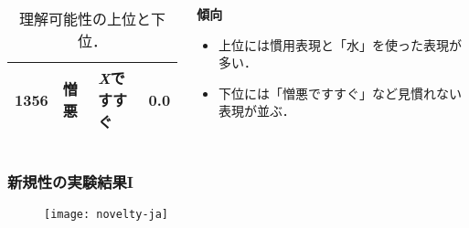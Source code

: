 \documentclass[12pt,usepdftitle=false]{beamer}
\begin{document}
\begin{frame}
\begin{columns}
\begin{column}{0.55\textwidth}
\begin{table}[t]
\begin{tabular}{rllc}
                    1356          & 憎悪          & \emph{X}ですすぐ     & 0.0           \\
                    \bottomrule%
                \end{tabular}
                \caption{理解可能性の上位と下位．}\label{tab:comprank}
            \end{table}
        \end{column}
        \begin{column}{0.45\textwidth}
            \noindent \textbf{傾向}
            \begin{itemize}
                \item 上位には慣用表現と「水」を使った表現が多い．
                \item 下位には「憎悪ですすぐ」など見慣れない表現が並ぶ．
            \end{itemize}


        \end{column}
    \end{columns}
\end{frame}

\begin{frame}
    \frametitle{新規性の実験結果I}
    \begin{figure}[h]\centering
        \vfill
        \texttt{[image: novelty-ja]}
    \end{figure}
\end{frame}
\end{document}
